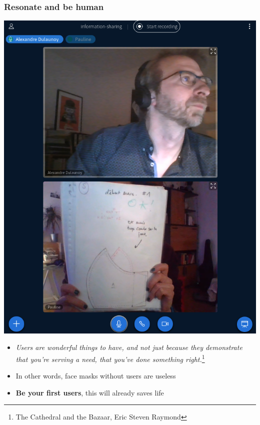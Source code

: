 \documentclass{beamer}
\begin{document}
\begin{frame}[fragile]
        \frametitle{Resonate and be human}

        \begin{multicols}{2}
          \null \vfill
\includegraphics[scale=0.2]{./images/pts-patron-1.png}
  \vfill \null
\columnbreak
           \null \vfill
        \begin{itemize}
                \item {\it Users are wonderful things to have, and not just because they demonstrate that you're serving a need, that you've done something right.}\footnote{The Cathedral and the Bazaar, Eric Steven Raymond}
                \item In other words, face masks without users are useless
                \item {\bf Be your first users}, this will already saves life
        \end{itemize}
          \vfill \null
\end{multicols}
\end{frame}
\end{document}
